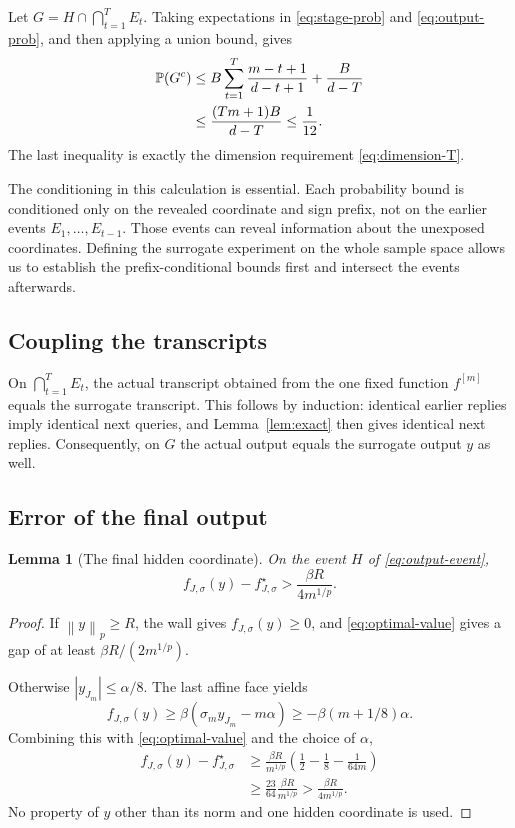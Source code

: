 \documentclass[11pt]{article}
\newtheorem{lemma}[theorem]{Lemma}
\theoremstyle{definition}
\theoremstyle{remark}
\newcommand{\PP}{\mathbb P}
\newcommand{\norm}[1]{\left\lVert#1\right\rVert}
\begin{document}
Let $G=H\cap\bigcap_{t=1}^T E_t$. Taking expectations in
\eqref{eq:stage-prob} and \eqref{eq:output-prob}, and then applying a union
bound, gives
\begin{align}
\PP(G^c)
&\le B\sum_{t=1}^T\frac{m-t+1}{d-t+1}+\frac{B}{d-T}\notag\\
&\le\frac{(Tm+1)B}{d-T}\le\frac1{12}.
\label{eq:good-prob}
\end{align}
The last inequality is exactly the dimension requirement
\eqref{eq:dimension-T}.

The conditioning in this calculation is essential. Each probability
bound is conditioned only on the revealed coordinate and sign prefix,
not on the earlier events $E_1,\ldots,E_{t-1}$. Those events can reveal
information about the unexposed coordinates. Defining the surrogate
experiment on the whole sample space allows us to establish the
prefix-conditional bounds first and intersect the events afterwards.

\subsection{Coupling the transcripts}

On $\bigcap_{t=1}^T E_t$, the actual transcript obtained from the one fixed
function $f^{[m]}$ equals the surrogate transcript. This follows by induction:
identical earlier replies imply identical next queries, and
Lemma~\ref{lem:exact} then gives identical next replies. Consequently, on $G$
the actual output equals the surrogate output $y$ as well.

\subsection{Error of the final output}

\begin{lemma}[The final hidden coordinate]\label{lem:terminal}
On the event $H$ of \eqref{eq:output-event},
\begin{equation}\label{eq:terminal-gap}
f_{J,\sigma}(y)-f_{J,\sigma}^\star
>\frac{\beta R}{4m^{1/p}}.
\end{equation}
\end{lemma}

\begin{proof}
If $\norm{y}_p\ge R$, the wall gives $f_{J,\sigma}(y)\ge0$, and
\eqref{eq:optimal-value} gives a gap of at least
$\beta R/(2m^{1/p})$.

Otherwise $|y_{J_m}|\le\alpha/8$. The last affine face yields
\[
f_{J,\sigma}(y)
\ge\beta(\sigma_m y_{J_m}-m\alpha)
\ge-\beta(m+1/8)\alpha.
\]
Combining this with \eqref{eq:optimal-value} and the choice of $\alpha$,
\begin{align*}
f_{J,\sigma}(y)-f_{J,\sigma}^\star
&\ge\frac{\beta R}{m^{1/p}}
\left(\frac12-\frac18-\frac1{64m}\right)\\
&\ge\frac{23}{64}\frac{\beta R}{m^{1/p}}
>\frac{\beta R}{4m^{1/p}}.
\end{align*}
No property of $y$ other than its norm and one hidden coordinate is used.
\end{proof}
\end{document}

